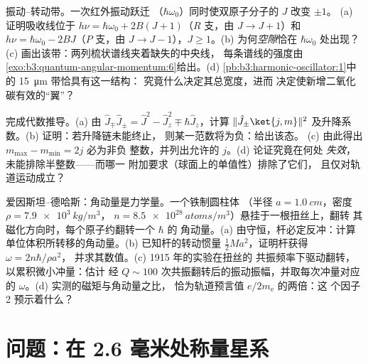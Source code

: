 \begin{exercise}[$\star\star\star$]\label{exo:b3:quantum-angular-momentum:10}
振动–转动带。一次红外振动跃迁
（$\hbar\omega_0$）同时使双原子分子的 $J$ 改变 $\pm1$。
(a) 证明吸收线位于 $h\nu =
\hbar\omega_0 + 2B(J+1)$（$R$ 支，由 $J \to J+1$）和
$h\nu = \hbar\omega_0 - 2BJ$（$P$ 支，由 $J \to J-1$），$J \ge
1$。(b) 为何\emph{空隙}恰在 $\hbar\omega_0$ 处出现？(c)
画出该带：两列梳状谱线夹着缺失的中央线，
每条谱线的强度由
\cref{exo:b3:quantum-angular-momentum:6}给出。(d)
\cref{pb:b3:harmonic-oscillator:1}中的 \qty{15}{\micro m} 带恰具有这一结构：
究竟什么决定其总宽度，进而
决定使新增二氧化碳有效的“翼”？
\end{exercise}

\begin{exercise}[$\star\star\star$]\label{exo:b3:quantum-angular-momentum:11}
完成代数推导。(a) 由 $\hat J_\mp\hat J_\pm = \hat J^2 -
\hat J_z^2 \mp \hbar\hat J_z$，计算 $\|\hat J_\pm\ket{j,m}\|^2$
及升降系数。(b) 证明：若升降链未能终止，
则某一范数将为负：给出该态。
(c) 由此得出 $m_{\max} - m_{\min} = 2j$ 必为非负
整数，并列出允许的 $j$。(d) 论证究竟在何处
\emph{失效}，未能排除半整数——而哪一
附加要求（球面上的单值性）排除了它们，
且仅对轨道运动成立？
\end{exercise}

\begin{exercise}[$\star\star\star$]\label{exo:b3:quantum-angular-momentum:12}
爱因斯坦–德哈斯：角动量是力学量。一个铁制圆柱体
（半径 $a = \qty{1.0}{cm}$，密度 $\rho = \qty{7.9e3}{kg/m^3}$，
$n = \qty{8.5e28}{atoms/m^3}$）悬挂于一根扭丝上，翻转
其磁化方向时，每个原子约翻转一个 $\hbar$ 的
角动量。(a) 由守恒，杆必定反冲：计算
单位体积所转移的角动量。(b) 已知杆的转动惯量 $\tfrac12 M
a^2$，证明杆获得 $\omega = 2n\hbar/\rho a^2$，
并求其数值。(c) 1915 年的实验在扭丝的
共振频率下驱动翻转，以累积微小冲量：估计
经 $Q \sim 100$ 次共振翻转后的振动振幅，并取每次冲量对应的
$\omega$。(d) 实测的磁矩与角动量之比，
恰为轨道预言值 $e/2m_{\text{e}}$ 的两倍：这
个因子 2 预示着什么？
\end{exercise}

\section{问题：在 2.6 毫米处称量星系}

